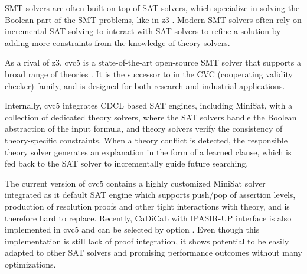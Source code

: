 SMT solvers are often built on top of SAT solvers, which specialize in solving the Boolean part of the SMT problems, like in z3 \cite{10.1007/978-3-540-78800-3_24}. Modern SMT solvers often rely on incremental SAT solving to interact with SAT solvers to refine a solution by adding more constraints from the knowledge of theory solvers.

As a rival of z3, cvc5 is a state-of-the-art open-source SMT solver that supports a broad range of theories \cite{10.1007/978-3-030-99524-9_24}. It is the successor to  in the CVC (cooperating validity checker) family, and is designed for both research and industrial applications.

Internally, cvc5 integrates CDCL based SAT engines, including  MiniSat, with a collection of dedicated theory solvers, where the SAT solvers handle the Boolean abstraction of the input formula, and theory solvers verify the consistency of theory-specific constraints. When a theory conflict is detected, the responsible theory solver generates an explanation in the form of a learned clause, which is fed back to the SAT solver to incrementally guide future searching.

The current version of cvc5 contains a highly customized MiniSat solver integrated as it default SAT engine which supports push/pop of assertion levels, production of resolution proofs and other tight interactions with theory, and is therefore hard to replace. Recently, CaDiCaL with IPASIR-UP interface is also implemented in cvc5 and can be selected by option . Even though this implementation is still lack of proof integration, it shows potential to be easily adapted to other SAT solvers and promising performance outcomes without many optimizations.
